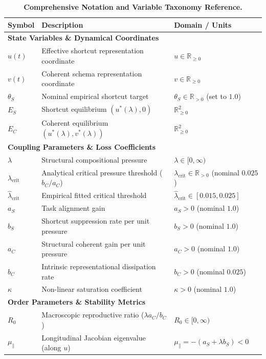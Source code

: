 \documentclass{article}
\theoremstyle{plain}
\theoremstyle{definition}
\begin{document}
\begin{table}[h]
\centering
\caption{\textbf{Comprehensive Notation and Variable Taxonomy Reference.}}
\label{tab:notation_taxonomy}
\vskip 0.1in
\begin{small}
\begin{tabular}{lll}
\toprule
Symbol & Description & Domain / Units \\
\midrule
\multicolumn{3}{l}{\textbf{State Variables \& Dynamical Coordinates}} \\
$u(t)$ & Effective shortcut representation coordinate & $u \in \mathbb{R}_{\ge 0}$ \\
$v(t)$ & Coherent schema representation coordinate & $v \in \mathbb{R}_{\ge 0}$ \\
$\theta_S$ & Nominal empirical shortcut target & $\theta_S \in \mathbb{R}_{> 0}$ (set to $1.0$) \\
$E_S$ & Shortcut equilibrium $(u^*(\lambda), 0)$ & $\mathbb{R}_{\ge 0}^2$ \\
$E_C$ & Coherent equilibrium $(u^*(\lambda), v^*(\lambda))$ & $\mathbb{R}_{\ge 0}^2$ \\
\midrule
\multicolumn{3}{l}{\textbf{Coupling Parameters \& Loss Coefficients}} \\
$\lambda$ & Structural compositional pressure & $\lambda \in [0, \infty)$ \\
$\lambda_{\text{crit}}$ & Analytical critical pressure threshold ($b_C / a_C$) & $\lambda_{\text{crit}} \in \mathbb{R}_{> 0}$ (nominal $0.025$) \\
$\hat{\lambda}_{\text{crit}}$ & Empirical fitted critical threshold & $\hat{\lambda}_{\text{crit}} \in [0.015, 0.025]$ \\
$a_S$ & Task alignment gain & $a_S > 0$ (nominal $1.0$) \\
$b_S$ & Shortcut suppression rate per unit pressure & $b_S > 0$ (nominal $1.0$) \\
$a_C$ & Structural coherent gain per unit pressure & $a_C > 0$ (nominal $1.0$) \\
$b_C$ & Intrinsic representational dissipation rate & $b_C > 0$ (nominal $0.025$) \\
$\kappa$ & Non-linear saturation coefficient & $\kappa > 0$ (nominal $1.0$) \\
\midrule
\multicolumn{3}{l}{\textbf{Order Parameters \& Stability Metrics}} \\
$R_0$ & Macroscopic reproductive ratio ($\lambda a_C / b_C$) & $R_0 \in [0, \infty)$ \\
$\mu_{\parallel}$ & Longitudinal Jacobian eigenvalue (along $u$) & $\mu_{\parallel} = -(a_S + \lambda b_S) < 0$ \\

\end{tabular}
\end{small}
\end{table}
\end{document}
